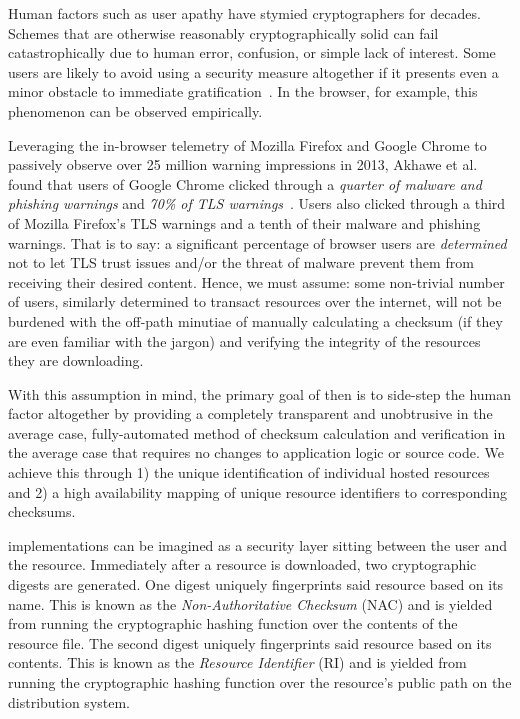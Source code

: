 Human factors such as user apathy have stymied cryptographers for decades.
Schemes that are otherwise reasonably cryptographically solid can fail
catastrophically due to human error, confusion, or simple lack of interest. Some
users are likely to avoid using a security measure altogether if it presents
even a minor obstacle to immediate gratification~\cite{Clickthrough, PGPBad}. In
the browser, for example, this phenomenon can be observed empirically.


Leveraging the in-browser telemetry of Mozilla Firefox and Google Chrome to
passively observe over 25 million warning impressions in 2013, Akhawe et al.
found that users of Google Chrome clicked through a \emph{quarter of malware and
phishing warnings} and \emph{70\% of TLS warnings}~\cite{Clickthrough}. Users
also clicked through a third of Mozilla Firefox's TLS warnings and a tenth of
their malware and phishing warnings. That is to say: a significant percentage of
browser users are \emph{determined} not to let TLS trust issues and/or the
threat of malware prevent them from receiving their desired content. Hence, we
must assume: some non-trivial number of users, similarly determined to transact
resources over the internet, will not be burdened with the off-path minutiae of
manually calculating a checksum (if they are even familiar with the jargon) and
verifying the integrity of the resources they are downloading.

With this assumption in mind, the primary goal of \SYSTEM{} then is to side-step
the human factor altogether by providing a completely transparent and
unobtrusive in the average case, fully-automated method of checksum calculation
and verification in the average case that requires no changes to application
logic or source code. We achieve this through 1) the unique identification of
individual hosted resources and 2) a high availability mapping of unique
resource identifiers to corresponding checksums.

\SYSTEM{} implementations can be imagined as a security layer sitting between
the user and the resource. Immediately after a resource is downloaded, two
cryptographic digests are generated. One digest uniquely fingerprints said
resource based on its name. This is known as the \emph{Non-Authoritative
Checksum} (NAC) and is yielded from running the cryptographic hashing function
over the contents of the resource file. The second digest uniquely fingerprints
said resource based on its contents. This is known as the \emph{Resource
Identifier} (RI) and is yielded from running the cryptographic hashing function
over the resource's public path on the distribution system.

